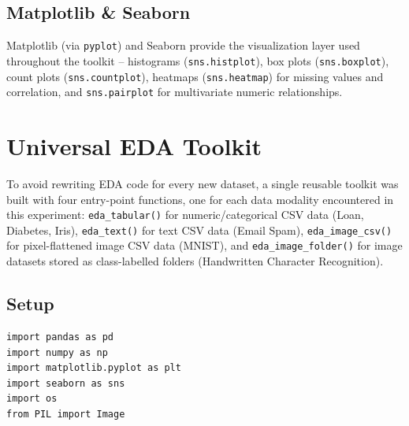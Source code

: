 \documentclass[12pt,a4paper]{article}
\begin{document}
\subsection{Matplotlib \& Seaborn}
Matplotlib (via \texttt{pyplot}) and Seaborn provide the visualization layer used throughout
the toolkit -- histograms (\texttt{sns.histplot}), box plots (\texttt{sns.boxplot}), count
plots (\texttt{sns.countplot}), heatmaps (\texttt{sns.heatmap}) for missing values and
correlation, and \texttt{sns.pairplot} for multivariate numeric relationships.

\section{Universal EDA Toolkit}
\label{sec:eda-toolkit}
To avoid rewriting EDA code for every new dataset, a single reusable toolkit was built with
four entry-point functions, one for each data modality encountered in this experiment:
\texttt{eda\_tabular()} for numeric/categorical CSV data (Loan, Diabetes, Iris),
\texttt{eda\_text()} for text CSV data (Email Spam), \texttt{eda\_image\_csv()} for
pixel-flattened image CSV data (MNIST), and \texttt{eda\_image\_folder()} for image datasets
stored as class-labelled folders (Handwritten Character Recognition).

\subsection{Setup}
\begin{lstlisting}
import pandas as pd
import numpy as np
import matplotlib.pyplot as plt
import seaborn as sns
import os
from PIL import Image
\end{lstlisting}
\end{document}
